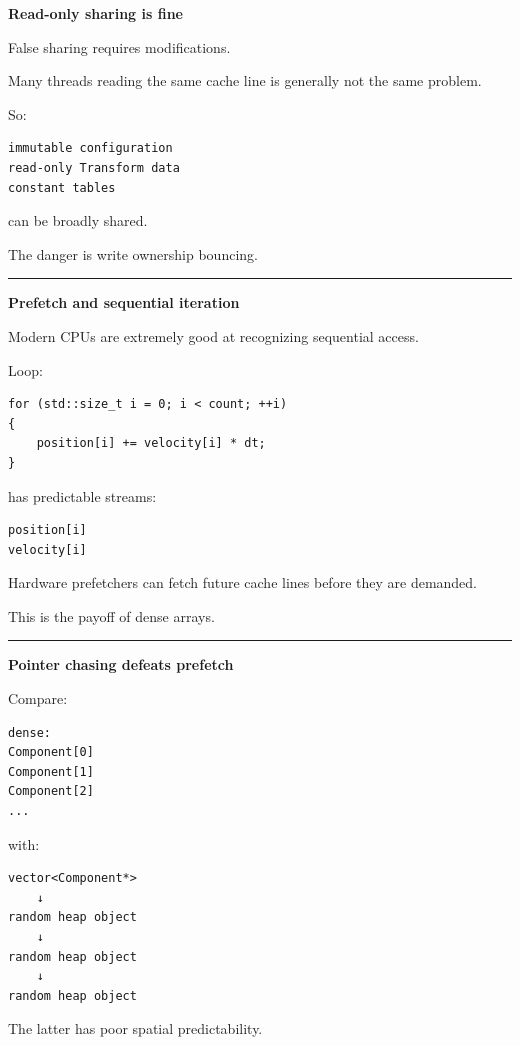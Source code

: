 \textbf{Read-only sharing is fine}

False sharing requires modifications.

Many threads reading the same cache line is generally not the same problem.

So:

\begin{verbatim}
immutable configuration
read-only Transform data
constant tables
\end{verbatim}

can be broadly shared.

The danger is write ownership bouncing.

\begin{center}\rule{0.5\linewidth}{0.5pt}\end{center}

\textbf{Prefetch and sequential iteration}

Modern CPUs are extremely good at recognizing sequential access.

Loop:

\begin{verbatim}
for (std::size_t i = 0; i < count; ++i)
{
    position[i] += velocity[i] * dt;
}
\end{verbatim}

has predictable streams:

\begin{verbatim}
position[i]
velocity[i]
\end{verbatim}

Hardware prefetchers can fetch future cache lines before they are demanded.

This is the payoff of dense arrays.

\begin{center}\rule{0.5\linewidth}{0.5pt}\end{center}

\textbf{Pointer chasing defeats prefetch}

Compare:

\begin{verbatim}
dense:
Component[0]
Component[1]
Component[2]
...
\end{verbatim}

with:

\begin{verbatim}
vector<Component*>
    ↓
random heap object
    ↓
random heap object
    ↓
random heap object
\end{verbatim}

The latter has poor spatial predictability.

